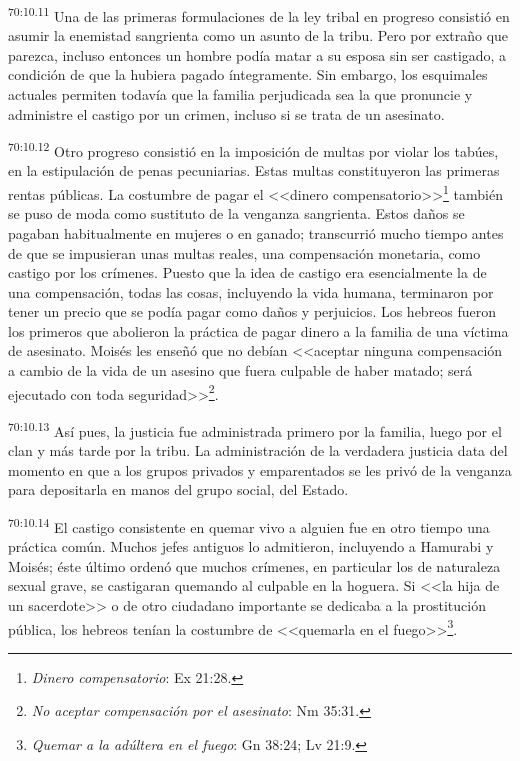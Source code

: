 \documentclass[twoside, 11pt]{book}
\begin{document}
\par
\textsuperscript{70:10.11} Una de las primeras formulaciones de la ley tribal en progreso consistió en asumir la enemistad sangrienta como un asunto de la tribu. Pero por extraño que parezca, incluso entonces un hombre podía matar a su esposa sin ser castigado, a condición de que la hubiera pagado íntegramente. Sin embargo, los esquimales actuales permiten todavía que la familia perjudicada sea la que pronuncie y administre el castigo por un crimen, incluso si se trata de un asesinato.

\par
\textsuperscript{70:10.12} Otro progreso consistió en la imposición de multas por violar los tabúes, en la estipulación de penas pecuniarias. Estas multas constituyeron las primeras rentas públicas. La costumbre de pagar el <<dinero compensatorio>>\footnote{\textit{Dinero compensatorio}: Ex 21:28.} también se puso de moda como sustituto de la venganza sangrienta. Estos daños se pagaban habitualmente en mujeres o en ganado; transcurrió mucho tiempo antes de que se impusieran unas multas reales, una compensación monetaria, como castigo por los crímenes. Puesto que la idea de castigo era esencialmente la de una compensación, todas las cosas, incluyendo la vida humana, terminaron por tener un precio que se podía pagar como daños y perjuicios. Los hebreos fueron los primeros que abolieron la práctica de pagar dinero a la familia de una víctima de asesinato. Moisés les enseñó que no debían <<aceptar ninguna compensación a cambio de la vida de un asesino que fuera culpable de haber matado; será ejecutado con toda seguridad>>\footnote{\textit{No aceptar compensación por el asesinato}: Nm 35:31.}.

\par
\textsuperscript{70:10.13} Así pues, la justicia fue administrada primero por la familia, luego por el clan y más tarde por la tribu. La administración de la verdadera justicia data del momento en que a los grupos privados y emparentados se les privó de la venganza para depositarla en manos del grupo social, del Estado.

\par
\textsuperscript{70:10.14} El castigo consistente en quemar vivo a alguien fue en otro tiempo una práctica común. Muchos jefes antiguos lo admitieron, incluyendo a Hamurabi y Moisés; éste último ordenó que muchos crímenes, en particular los de naturaleza sexual grave, se castigaran quemando al culpable en la hoguera. Si <<la hija de un sacerdote>> o de otro ciudadano importante se dedicaba a la prostitución pública, los hebreos tenían la costumbre de <<quemarla en el fuego>>\footnote{\textit{Quemar a la adúltera en el fuego}: Gn 38:24; Lv 21:9.}.
\end{document}
